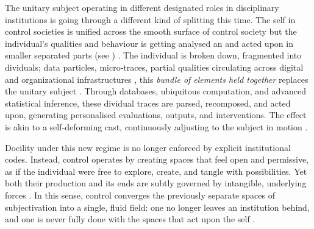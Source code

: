 The unitary subject operating in different designated roles in disciplinary institutions is going through a different kind of splitting this time. The self in control societies is unified across the smooth surface of control society but the individual's qualities and behaviour is getting analysed an and acted upon in smaller separated parts (see \cite[5]{mackenzie2021}) . The individual is broken down, fragmented into dividuals; data particles, micro‑traces, partial qualities circulating across digital and organizational infrastructures \parencite{deleuze1992a}, this \textit{bundle of elements held together} replaces the unitary subject \parencite[6]{mackenzie2021} . Through databases, ubiquitous computation, and advanced statistical inference, these dividual traces are parsed, recomposed, and acted upon, generating personalised evaluations, outputs, and interventions. The effect is akin to a self‑deforming cast, continuously adjusting to the subject in motion \parencite[4]{deleuze1992a}.

Docility under this new regime is no longer enforced by explicit institutional codes. Instead, control operates by creating spaces that feel open and permissive, as if the individual were free to explore, create, and tangle with possibilities. Yet both their production and its ends are subtly governed by intangible, underlying forces \parencite[75]{hui2015}. In this sense, control converges the previously separate spaces of subjectivation into a single, fluid field: one no longer leaves an institution behind, and one is never fully done with the spaces that act upon the self \parencite[6]{deleuze1992a}.



